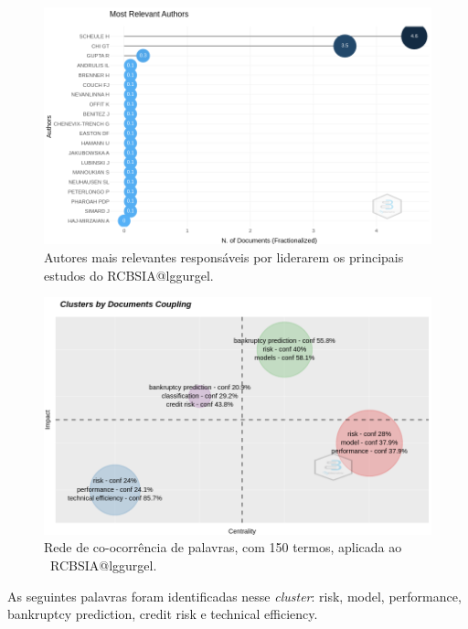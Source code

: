 \begin{figure}
    \centering
\includegraphics[angle=0,width=1\textwidth]{experiments/lggurgel/AnaliseBibliometrica/RiscoBancario/Figs/Descritiva/RCBSIA-AutoresRelevantes.png}
    \caption{Autores mais relevantes responsáveis por liderarem os principais estudos do \dataset RCBSIA@lggurgel.}
    \label{fig:RCBSIA@lggurgel:RelevantAuthors}
\end{figure}

\begin{figure}[htp]
    \centering
    \includegraphics[angle=0,width=1\textwidth]{experiments/lggurgel/AnaliseBibliometrica/RiscoBancario/Figs/Metricas/RCBSIA-ClusterDocumentos.png}
    \caption{Rede de co-ocorrência de palavras, com 150 termos, aplicada ao \dataset\   RCBSIA@lggurgel.}
    \label{fig:RCBSIA@lggurgel:redecoocorr}
\end{figure}

As seguintes palavras foram identificadas nesse \textit{cluster}:
risk,
model,
performance,
bankruptcy prediction,
credit risk e
technical efficiency. 

